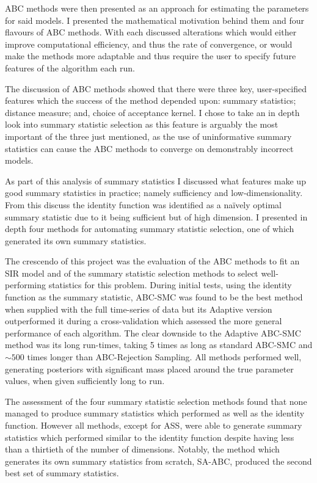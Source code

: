 \documentclass[11pt,a4paper]{article}
\theoremstyle{break}
\begin{document}
  \par ABC methods were then presented as an approach for estimating the parameters for said models. I presented the mathematical motivation behind them and four flavours of ABC methods. With each discussed alterations which would either improve computational efficiency, and thus the rate of convergence, or would make the methods more adaptable and thus require the user to specify future features of the algorithm each run.

  \par The discussion of ABC methods showed that there were three key, user-specified features which the success of the method depended upon: summary statistics; distance measure; and, choice of acceptance kernel. I chose to take an in depth look into summary statistic selection as this feature is arguably the most important of the three just mentioned, as the use of uninformative summary statistics can cause the ABC methods to converge on demonstrably incorrect models.

  \par As part of this analysis of summary statistics I discussed what features make up good summary statistics in practice; namely sufficiency and low-dimensionality. From this discuss the identity function was identified as a na\"ively optimal summary statistic due to it being sufficient but of high dimension. I presented in depth four methods for automating summary statistic selection, one of which generated its own summary statistics.

  \par The crescendo of this project was the evaluation of the ABC methods to fit an SIR model and of the summary statistic selection methods to select well-performing statistics for this problem. During initial tests, using the identity function as the summary statistic, ABC-SMC was found to be the best method when supplied with the full time-series of data but its Adaptive version outperformed it during a cross-validation which assessed the more general performance of each algorithm. The clear downside to the Adaptive ABC-SMC method was its long run-times, taking 5 times as long as standard ABC-SMC and $\sim 500$ times longer than ABC-Rejection Sampling. All methods performed well, generating posteriors with significant mass placed around the true parameter values, when given sufficiently long to run.

  \par The assessment of the four summary statistic selection methods found that none managed to produce summary statistics which performed as well as the identity function. However all methods, except for ASS, were able to generate summary statistics which performed similar to the identity function despite having less than a thirtieth of the number of dimensions. Notably, the method which generates its own summary statistics from scratch, SA-ABC, produced the second best set of summary statistics.
\end{document}
